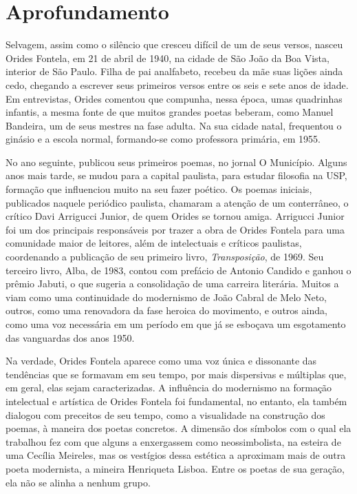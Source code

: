 \documentclass[12pt]{extarticle}
\begin{document}
\section{Aprofundamento}

Selvagem, assim como o silêncio que cresceu difícil de um de seus
versos, nasceu Orides Fontela, em 21 de abril de 1940, na cidade de São
João da Boa Vista, interior de São Paulo. Filha de pai analfabeto,
recebeu da mãe suas lições ainda cedo, chegando a escrever seus
primeiros versos entre os seis e sete anos de idade. Em entrevistas,
Orides comentou que compunha, nessa época, umas quadrinhas infantis, a
mesma fonte de que muitos grandes poetas beberam, como Manuel Bandeira,
um de seus mestres na fase adulta. Na sua cidade natal, frequentou o
ginásio e a escola normal, formando-se como professora primária, em
1955.

No ano seguinte, publicou seus primeiros poemas, no jornal O Município.
Alguns anos mais tarde, se mudou para a capital paulista, para estudar
filosofia na USP, formação que influenciou muito na seu fazer poético.
Os poemas iniciais, publicados naquele periódico paulista, chamaram a
atenção de um conterrâneo, o crítico Davi Arrigucci Junior, de quem
Orides se tornou amiga. Arrigucci Junior foi um dos principais
responsáveis por trazer a obra de Orides Fontela para uma comunidade
maior de leitores, além de intelectuais e críticos paulistas,
coordenando a publicação de seu primeiro livro, \emph{Transposição}, de
1969. Seu terceiro livro, Alba, de 1983, contou com prefácio de Antonio
Candido e ganhou o prêmio Jabuti, o que sugeria a consolidação de uma
carreira literária. Muitos a viam como uma continuidade do modernismo de
João Cabral de Melo Neto, outros, como uma renovadora da fase heroica do
movimento, e outros ainda, como uma voz necessária em um período em que
já se esboçava um esgotamento das vanguardas dos anos 1950.

Na verdade, Orides Fontela aparece como uma voz única e dissonante das
tendências que se formavam em seu tempo, por mais dispersivas e
múltiplas que, em geral, elas sejam caracterizadas. A influência do
modernismo na formação intelectual e artística de Orides Fontela foi
fundamental, no entanto, ela também dialogou com preceitos de seu tempo,
como a visualidade na construção dos poemas, à maneira dos poetas
concretos. A dimensão dos símbolos com o qual ela trabalhou fez com que
alguns a enxergassem como neossimbolista, na esteira de uma Cecília
Meireles, mas os vestígios dessa estética a aproximam mais de outra
poeta modernista, a mineira Henriqueta Lisboa. Entre os poetas de sua
geração, ela não se alinha a nenhum grupo.
\end{document}
